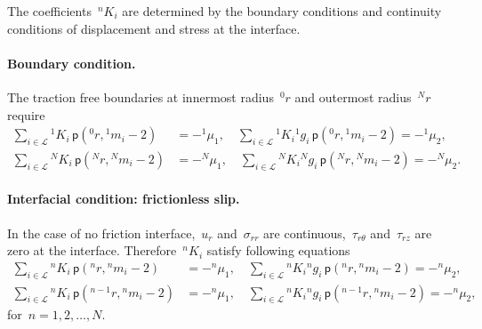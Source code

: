 \documentclass[preprint,12pt,times]{elsarticle}
\numberwithin{equation}{section}
\newcommand{\pr}[1]{\left( #1 \right)}
\newcommand{\p}{\,\mathsf{p}}
\renewcommand{\>}{$\Rightarrow$}
\begin{document}
The coefficients~${}^{n}\!{K_{i}}$ are determined by the boundary conditions and continuity conditions of displacement and stress at the interface.

\paragraph{Boundary condition.}

The traction free boundaries at innermost radius~${}^{0}\!{r}$ and outermost radius~${}^{N}\!{r}$ require
\begin{subequations}
	\begin{align}
	\sum_{i \in \mathcal{L}} {}^{1}\!{K_{i}} \p\pr{{}^{0}\!{r},{}^{1}\!{m_{i}} - 2} & = -{}^{1}\!{\mu_{1}}, \quad
	\sum_{i \in \mathcal{L}} {}^{1}\!{K_{i}} {}^{1}\!{g_{i}} \p\pr{{}^{0}\!{r},{}^{1}\!{m_{i}} - 2} = -{}^{1}\!{\mu_{2}},\\
	\sum_{i \in \mathcal{L}} {}^{N}\!{K_{i}} \p\pr{{}^{N}\!{r},{}^{N}\!{m_{i}} - 2} & = -{}^{N}\!{\mu_{1}}, \quad
	\sum_{i \in \mathcal{L}} {}^{N}\!{K_{i}} {}^{N}\!{g_{i}} \p\pr{{}^{N}\!{r},{}^{N}\!{m_{i}} - 2} = -{}^{N}\!{\mu_{2}}.
	\end{align}
	\label{eq:boundary}
\end{subequations}

\paragraph{Interfacial condition: frictionless slip.}

In the case of no friction interface,~$u_r$ and~$\sigma_{rr}$ are continuous,~$\tau_{r\theta}$ and~$\tau_{rz}$ are zero at the interface. Therefore~${}^{n}\!{K_{i}}$ satisfy following equations
\begin{subequations}
	\begin{align}
	\sum_{i \in \mathcal{L}} {}^{n}\!{K_{i}} \p\pr{{}^{n}\!{r},{}^{n}\!{m_{i}} - 2} & = -{}^{n}\!{\mu_{1}}, \quad
	\sum_{i \in \mathcal{L}} {}^{n}\!{K_{i}} {}^{n}\!{g_{i}} \p\pr{{}^{n}\!{r},{}^{n}\!{m_{i}} - 2} = -{}^{n}\!{\mu_{2}}, \\
	\sum_{i \in \mathcal{L}} {}^{n}\!{K_{i}} \p\pr{{}^{n-1}\!{r},{}^{n}\!{m_{i}} - 2} & = -{}^{n}\!{\mu_{1}}, \quad
	\sum_{i \in \mathcal{L}} {}^{n}\!{K_{i}} {}^{n}\!{g_{i}} \p\pr{{}^{n-1}\!{r},{}^{n}\!{m_{i}} - 2} = -{}^{n}\!{\mu_{2}},
	\end{align}
	\label{eq:nofriction_interface}
\end{subequations}
for~$n = 1,2,\dots,N$.
\end{document}
